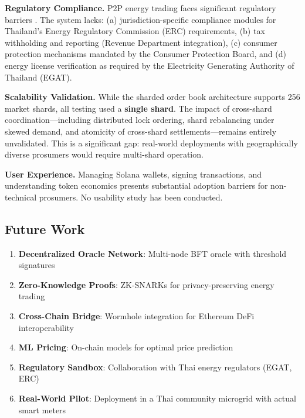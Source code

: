 \documentclass[conference]{IEEEtran}
\begin{document}
\textbf{Regulatory Compliance.} P2P energy trading faces significant regulatory barriers \cite{zhou2020}. The system lacks: (a) jurisdiction-specific compliance modules for Thailand's Energy Regulatory Commission (ERC) requirements, (b) tax withholding and reporting (Revenue Department integration), (c) consumer protection mechanisms mandated by the Consumer Protection Board, and (d) energy license verification as required by the Electricity Generating Authority of Thailand (EGAT).

\textbf{Scalability Validation.} While the sharded order book architecture supports 256 market shards, all testing used a \textbf{single shard}. The impact of cross-shard coordination---including distributed lock ordering, shard rebalancing under skewed demand, and atomicity of cross-shard settlements---remains entirely unvalidated. This is a significant gap: real-world deployments with geographically diverse prosumers would require multi-shard operation.

\textbf{User Experience.} Managing Solana wallets, signing transactions, and understanding token economics presents substantial adoption barriers for non-technical prosumers. No usability study has been conducted.

\subsection{Future Work}

\begin{enumerate}
    \item \textbf{Decentralized Oracle Network}: Multi-node BFT oracle with threshold signatures
    \item \textbf{Zero-Knowledge Proofs}: ZK-SNARKs for privacy-preserving energy trading
    \item \textbf{Cross-Chain Bridge}: Wormhole integration for Ethereum DeFi interoperability
    \item \textbf{ML Pricing}: On-chain models for optimal price prediction
    \item \textbf{Regulatory Sandbox}: Collaboration with Thai energy regulators (EGAT, ERC)
    \item \textbf{Real-World Pilot}: Deployment in a Thai community microgrid with actual smart meters
\end{enumerate}

\end{document}
